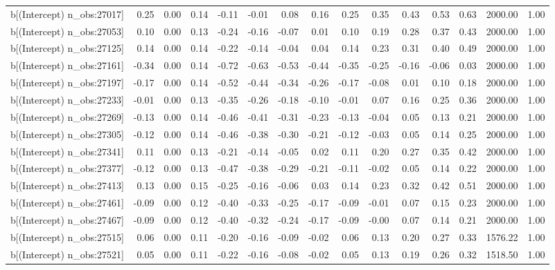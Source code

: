 \begin{table}[ht]
\begin{tabular}{rrrrrrrrrrrrrrr}
  b[(Intercept) n\_obs:27017] & 0.25 & 0.00 & 0.14 & -0.11 & -0.01 & 0.08 & 0.16 & 0.25 & 0.35 & 0.43 & 0.53 & 0.63 & 2000.00 & 1.00 \\ 
  b[(Intercept) n\_obs:27053] & 0.10 & 0.00 & 0.13 & -0.24 & -0.16 & -0.07 & 0.01 & 0.10 & 0.19 & 0.28 & 0.37 & 0.43 & 2000.00 & 1.00 \\ 
  b[(Intercept) n\_obs:27125] & 0.14 & 0.00 & 0.14 & -0.22 & -0.14 & -0.04 & 0.04 & 0.14 & 0.23 & 0.31 & 0.40 & 0.49 & 2000.00 & 1.00 \\ 
  b[(Intercept) n\_obs:27161] & -0.34 & 0.00 & 0.14 & -0.72 & -0.63 & -0.53 & -0.44 & -0.35 & -0.25 & -0.16 & -0.06 & 0.03 & 2000.00 & 1.00 \\ 
  b[(Intercept) n\_obs:27197] & -0.17 & 0.00 & 0.14 & -0.52 & -0.44 & -0.34 & -0.26 & -0.17 & -0.08 & 0.01 & 0.10 & 0.18 & 2000.00 & 1.00 \\ 
  b[(Intercept) n\_obs:27233] & -0.01 & 0.00 & 0.13 & -0.35 & -0.26 & -0.18 & -0.10 & -0.01 & 0.07 & 0.16 & 0.25 & 0.36 & 2000.00 & 1.00 \\ 
  b[(Intercept) n\_obs:27269] & -0.13 & 0.00 & 0.14 & -0.46 & -0.41 & -0.31 & -0.23 & -0.13 & -0.04 & 0.05 & 0.13 & 0.21 & 2000.00 & 1.00 \\ 
  b[(Intercept) n\_obs:27305] & -0.12 & 0.00 & 0.14 & -0.46 & -0.38 & -0.30 & -0.21 & -0.12 & -0.03 & 0.05 & 0.14 & 0.25 & 2000.00 & 1.00 \\ 
  b[(Intercept) n\_obs:27341] & 0.11 & 0.00 & 0.13 & -0.21 & -0.14 & -0.05 & 0.02 & 0.11 & 0.20 & 0.27 & 0.35 & 0.42 & 2000.00 & 1.00 \\ 
  b[(Intercept) n\_obs:27377] & -0.12 & 0.00 & 0.13 & -0.47 & -0.38 & -0.29 & -0.21 & -0.11 & -0.02 & 0.05 & 0.14 & 0.22 & 2000.00 & 1.00 \\ 
  b[(Intercept) n\_obs:27413] & 0.13 & 0.00 & 0.15 & -0.25 & -0.16 & -0.06 & 0.03 & 0.14 & 0.23 & 0.32 & 0.42 & 0.51 & 2000.00 & 1.00 \\ 
  b[(Intercept) n\_obs:27461] & -0.09 & 0.00 & 0.12 & -0.40 & -0.33 & -0.25 & -0.17 & -0.09 & -0.01 & 0.07 & 0.15 & 0.23 & 2000.00 & 1.00 \\ 
  b[(Intercept) n\_obs:27467] & -0.09 & 0.00 & 0.12 & -0.40 & -0.32 & -0.24 & -0.17 & -0.09 & -0.00 & 0.07 & 0.14 & 0.21 & 2000.00 & 1.00 \\ 
  b[(Intercept) n\_obs:27515] & 0.06 & 0.00 & 0.11 & -0.20 & -0.16 & -0.09 & -0.02 & 0.06 & 0.13 & 0.20 & 0.27 & 0.33 & 1576.22 & 1.00 \\ 
  b[(Intercept) n\_obs:27521] & 0.05 & 0.00 & 0.11 & -0.22 & -0.16 & -0.08 & -0.02 & 0.05 & 0.13 & 0.19 & 0.26 & 0.32 & 1518.50 & 1.00 \\ 

\end{tabular}
\end{table}
